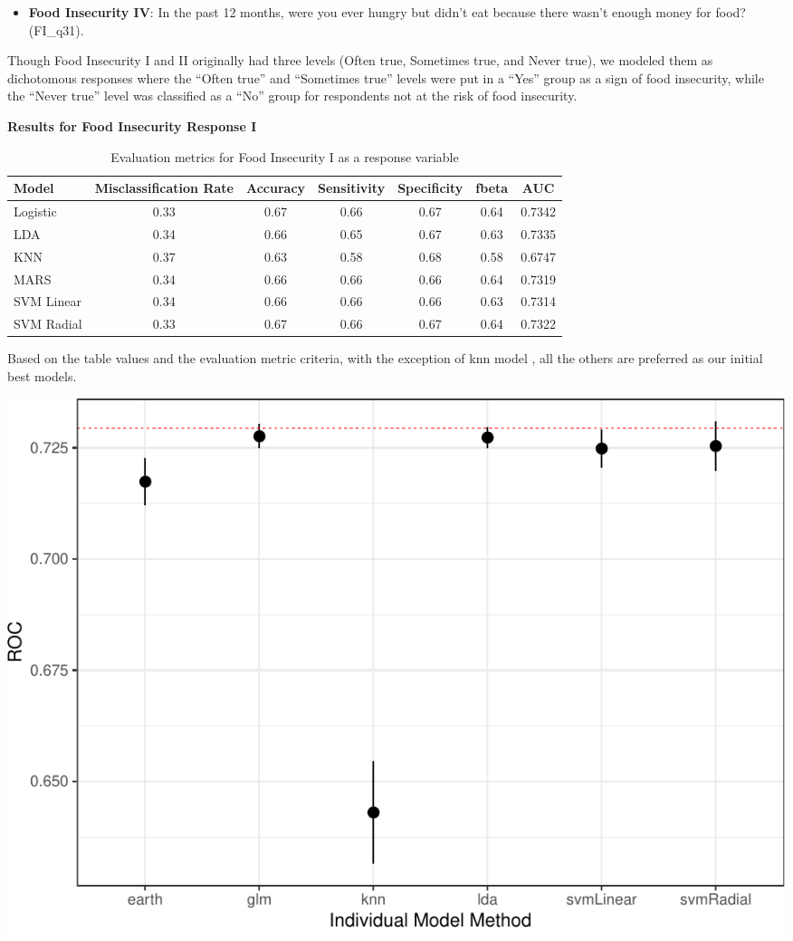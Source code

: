 \documentclass[
  10pt,
]{article}
\providecommand{\tightlist}{%
  \setlength{\itemsep}{0pt}\setlength{\parskip}{0pt}}
\begin{document}
\begin{itemize}
\tightlist
\item
  \textbf{Food Insecurity IV}: In the past 12 months, were you ever hungry but didn't eat because there wasn't enough money for food? (FI\_q31).
\end{itemize}

Though Food Insecurity I and II originally had three levels (Often true, Sometimes true, and Never true), we modeled them as dichotomous responses where the ``Often true'' and ``Sometimes true'' levels were put in a ``Yes'' group as a sign of food insecurity, while the ``Never true'' level was classified as a ``No'' group for respondents not at the risk of food insecurity.

\textbf{Results for Food Insecurity Response I}

\begin{table}[H]

\caption{\label{tab:unnamed-chunk-17}Evaluation metrics for Food Insecurity I  as a response variable}
\centering
\fontsize{12}{14}\selectfont
\begin{tabular}[t]{lcccccc}
\toprule
Model & Misclassification Rate & Accuracy & Sensitivity & Specificity & fbeta & AUC\\
\midrule
Logistic & 0.33 & 0.67 & 0.66 & 0.67 & 0.64 & 0.7342\\
LDA & 0.34 & 0.66 & 0.65 & 0.67 & 0.63 & 0.7335\\
KNN & 0.37 & 0.63 & 0.58 & 0.68 & 0.58 & 0.6747\\
MARS & 0.34 & 0.66 & 0.66 & 0.66 & 0.64 & 0.7319\\
SVM Linear & 0.34 & 0.66 & 0.66 & 0.66 & 0.63 & 0.7314\\
SVM Radial & 0.33 & 0.67 & 0.66 & 0.67 & 0.64 & 0.7322\\
\bottomrule
\end{tabular}
\end{table}

Based on the table values and the evaluation metric criteria, with the exception of knn model , all the others are preferred as our initial best models.\\

\begin{center}\includegraphics{final_phase2_report_files/figure-latex/unnamed-chunk-18-1} \end{center}
\end{document}

